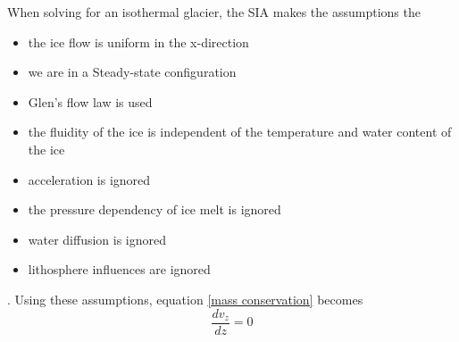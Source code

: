 
When solving for an isothermal glacier, the SIA makes the assumptions the
\begin{itemize}
    \item the ice flow is uniform in the x-direction
    \item we are in a Steady-state configuration
    \item Glen's flow law is used
    \item the fluidity of the ice is independent of the temperature and water content of the ice
    \item acceleration is ignored
    \item the pressure dependency of ice melt is ignored
    \item water diffusion is ignored
    \item lithosphere influences are ignored
\end{itemize}
\citep{LEMEUR2004, Baral2001, Nye1952, Greve1997}. Using these assumptions, equation \ref{mass conservation} becomes
\begin{equation}
    \frac{d v_z}{dz} = 0
\end{equation}
